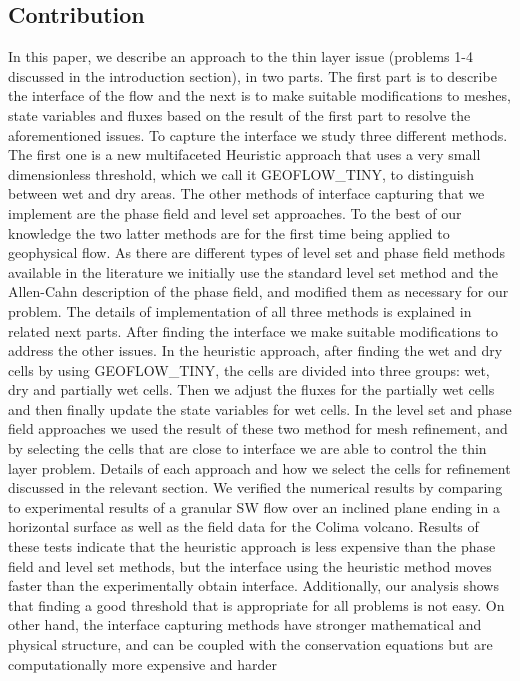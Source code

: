 \documentclass[review]{elsarticle}
\begin{document}
\subsection{Contribution}
In this paper, we describe an approach to the thin layer issue (problems 1-4 discussed in the introduction section), in two parts. 
The first part is to describe the interface of the 
flow and the next is to make suitable modifications to meshes, state variables and fluxes based on the result of the first part to resolve the aforementioned issues.
To capture the interface we study three different methods. The first one is a new multifaceted Heuristic approach that uses a very small dimensionless threshold, which we call it GEOFLOW\_TINY, to 
distinguish between wet and dry areas. The other methods of interface capturing that we implement are the phase field and level set approaches.
To the best of our knowledge the two latter methods are for the first time being applied to geophysical flow. 
As there are different types of level set and phase field methods available in the 
literature we initially use the standard level set method and the Allen-Cahn description of the phase field, and modified them as necessary for our problem. 
The details of implementation of all three methods is explained in related next parts.
After finding the interface we make suitable modifications to address the other issues. In the heuristic approach, after finding the wet and dry cells by using GEOFLOW\_TINY, the cells are divided 
into three groups: wet, dry and partially wet cells. Then we adjust the fluxes for the partially wet cells and then finally update the state variables for wet cells.
In the level set and phase field approaches we used the result of these two method for mesh refinement, and by selecting the cells that are close to interface we are able to control the thin layer problem. 
Details of each approach and how we select the cells for refinement discussed in the relevant section.
We verified the numerical results by comparing to experimental results of a granular SW flow over an inclined plane ending in a horizontal surface as well as the field data for the Colima volcano.
Results of these tests indicate that
the heuristic approach is less expensive than the phase field and level set methods, but the interface using the heuristic method moves faster than the 
experimentally obtain interface. Additionally, our analysis shows that finding a good threshold that is appropriate for all problems is not easy. 
On other hand, the interface capturing methods have stronger mathematical and physical structure, and can be coupled with the conservation equations but are computationally more expensive and harder 
\end{document}
